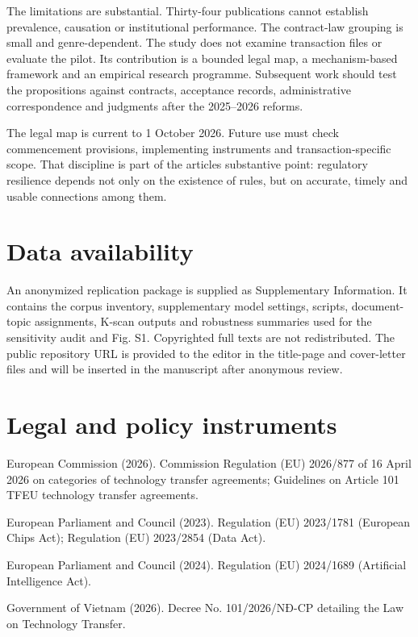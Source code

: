 \documentclass[
]{article}
\begin{document}
The limitations are substantial. Thirty-four publications cannot
establish prevalence, causation or institutional performance. The
contract-law grouping is small and genre-dependent. The study does not
examine transaction files or evaluate the pilot. Its contribution is a
bounded legal map, a mechanism-based framework and an empirical research
programme. Subsequent work should test the propositions against
contracts, acceptance records, administrative correspondence and
judgments after the 2025--2026 reforms.

The legal map is current to 1 October 2026. Future use must check
commencement provisions, implementing instruments and
transaction-specific scope. That discipline is part of the
article\textquotesingle s substantive point: regulatory resilience
depends not only on the existence of rules, but on accurate, timely and
usable connections among them.

\section{Data availability}\label{data-availability}

An anonymized replication package is supplied as Supplementary
Information. It contains the corpus inventory, supplementary model
settings, scripts, document-topic assignments, K-scan outputs and
robustness summaries used for the sensitivity audit and Fig. S1.
Copyrighted full texts are not redistributed. The public repository URL
is provided to the editor in the title-page and cover-letter files and
will be inserted in the manuscript after anonymous review.

\section{Legal and policy
instruments}\label{legal-and-policy-instruments}

European Commission (2026). Commission Regulation (EU) 2026/877 of 16
April 2026 on categories of technology transfer agreements; Guidelines
on Article 101 TFEU technology transfer agreements.

European Parliament and Council (2023). Regulation (EU) 2023/1781
(European Chips Act); Regulation (EU) 2023/2854 (Data Act).

European Parliament and Council (2024). Regulation (EU) 2024/1689
(Artificial Intelligence Act).

Government of Vietnam (2026). Decree No. 101/2026/NĐ-CP detailing the
Law on Technology Transfer.
\end{document}

